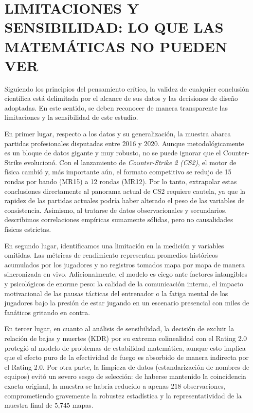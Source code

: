 \documentclass[twocolumn,10pt]{article}
\begin{document}
\section{LIMITACIONES Y SENSIBILIDAD: LO QUE LAS MATEMÁTICAS NO PUEDEN VER}

Siguiendo los principios del pensamiento crítico, la validez de cualquier conclusión científica está delimitada por el alcance de sus datos y las decisiones de diseño adoptadas. En este sentido, se deben reconocer de manera transparente las limitaciones y la sensibilidad de este estudio.

En primer lugar, respecto a los datos y su generalización, la muestra abarca partidas profesionales disputadas entre 2016 y 2020. Aunque metodológicamente es un bloque de datos gigante y muy robusto, no se puede ignorar que el Counter-Strike evolucionó. Con el lanzamiento de \textit{Counter-Strike 2 (CS2)}, el motor de física cambió y, más importante aún, el formato competitivo se redujo de 15 rondas por bando (MR15) a 12 rondas (MR12). Por lo tanto, extrapolar estas conclusiones directamente al panorama actual de CS2 requiere cautela, ya que la rapidez de las partidas actuales podría haber alterado el peso de las variables de consistencia. Asimismo, al tratarse de datos observacionales y secundarios, describimos correlaciones empíricas sumamente sólidas, pero no causalidades físicas estrictas.

En segundo lugar, identificamos una limitación en la medición y variables omitidas. Las métricas de rendimiento representan promedios históricos acumulados por los jugadores y no registros tomados mapa por mapa de manera sincronizada en vivo. Adicionalmente, el modelo es ciego ante factores intangibles y psicológicos de enorme peso: la calidad de la comunicación interna, el impacto motivacional de las pausas tácticas del entrenador o la fatiga mental de los jugadores bajo la presión de estar jugando en un escenario presencial con miles de fanáticos gritando en contra.

En tercer lugar, en cuanto al análisis de sensibilidad, la decisión de excluir la relación de bajas y muertes (KDR) por su extrema colinealidad con el Rating 2.0 protegió al modelo de problemas de estabilidad matemática, aunque esto implica que el efecto puro de la efectividad de fuego es absorbido de manera indirecta por el Rating 2.0. Por otra parte, la limpieza de datos (estandarización de nombres de equipos) evitó un severo sesgo de selección: de haberse mantenido la coincidencia exacta original, la muestra se habría reducido a apenas 218 observaciones, comprometiendo gravemente la robustez estadística y la representatividad de la muestra final de 5,745 mapas.
\end{document}
